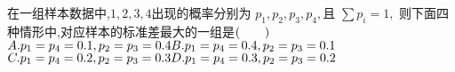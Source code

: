 \documentclass[class=ctexart,crop=false]{standalone}
\begin{document}
    在一组样本数据中,$1,2,3,4$出现的概率分别为 $p_1,p_2,p_3,p_4,$且 $\sum p_i=1,$
    则下面四种情形中,对应样本的标准差最大的一组是$\hfill (\qquad)\\$
    $A. p_1=p_4=0.1,p_2=p_3=0.4\hfill B. p_1=p_4=0.4,p_2=p_3=0.1\hfill \quad  \\ $
    $C. p_1=p_4=0.2,p_2=p_3=0.3\hfill D. p_1=p_4=0.3,p_2=p_3=0.2\hfill \quad  \\ $
\end{document}
